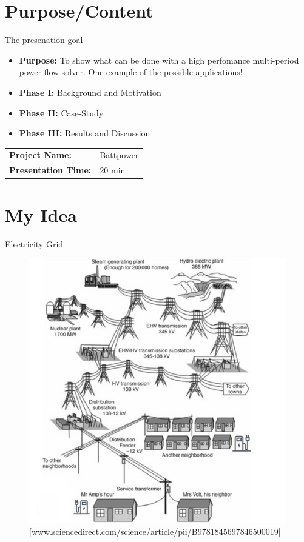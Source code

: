 \documentclass{beamer}
\begin{document}
\begin{frame}
\titlepage
\end{frame}
\section{Purpose/Content}
\begin{frame}{The presenation goal}
\begin{itemize}
\item \textbf{Purpose:} To show what can be done with a high perfomance multi-period power flow solver. One example of the possible applications! 
\item \textbf{Phase I:} Background and Motivation
\item \textbf{Phase II:} Case-Study
\item \textbf{Phase III:} Results and Discussion
\end{itemize}
\begin{center}
\begin{tabular}{|l l|} 
\hline
\rowcolor{Gray} \textbf{Project Name:} &Battpower \\
\textbf{Presentation Time:}& 20 min \\
\hline
\end{tabular}
\end{center}
\end{frame}

\section{My Idea}
\begin{frame}{Electricity Grid}
\begin{figure}[!htbp]
\centering
\includegraphics[width=2.8 in , height=2.4 in]{Figures/EVchalendge1.png}
\caption{\tiny[www.sciencedirect.com/science/article/pii/B9781845697846500019]}
\end{figure}
\end{frame}
\end{document}
